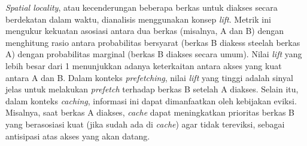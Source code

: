\textit{Spatial locality}, atau kecenderungan beberapa berkas untuk diakses secara berdekatan dalam waktu, dianalisis menggunakan konsep \textit{lift}. Metrik ini mengukur kekuatan asosiasi antara dua berkas (misalnya, A dan B) dengan menghitung rasio antara probabilitas bersyarat (berkas B diakess steelah berkas A) dengan probabilitas marginal (berkas B diakses secara umum). Nilai \textit{lift} yang lebih besar dari 1 menunjukkan adanya keterkaitan antara akses yang kuat antara A dan B. Dalam konteks \textit{prefetching}, nilai \textit{lift} yang tinggi adalah sinyal jelas untuk melakukan \textit{prefetch} terhadap berkas B setelah A diakses. Selain itu, dalam konteks \textit{caching}, informasi ini dapat dimanfaatkan oleh kebijakan eviksi. Misalnya, saat berkas A diakses, \textit{cache} dapat meningkatkan prioritas berkas B yang berasosiasi kuat (jika sudah ada di \textit{cache}) agar tidak tereviksi, sebagai antisipasi atas akses yang akan datang.
